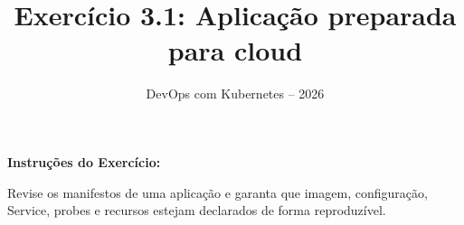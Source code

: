 \documentclass[11pt,a4paper]{article}
\title{\color{secondary}\Huge\textbf{Exercício 3.1: Aplicação preparada para cloud}}
\author{\color{primary}DevOps com Kubernetes -- 2026}
\date{}
\begin{document}
\maketitle


\textbf{Instruções do Exercício:}

\begin{tcolorbox}[colback=blue!5!white,colframe=blue!75!black]
Revise os manifestos de uma aplicação e garanta que imagem, configuração, Service, probes e recursos estejam declarados de forma reproduzível.
\end{tcolorbox}
\end{document}
